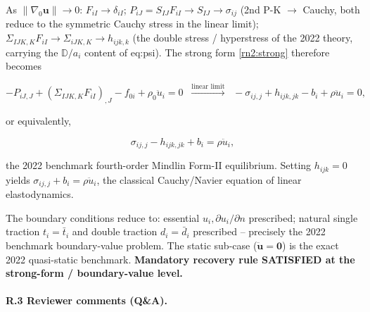 \documentclass[11pt]{article}
\begin{document}
As $\|\nabla_0\mathbf{u}\|\to0$: $F_{iI}\to\delta_{iI}$; $P_{iJ}=S_{IJ}F_{iI}\to S_{IJ}\to\sigma_{ij}$ (2nd P-K $\to$ Cauchy, both reduce to the symmetric Cauchy stress in the linear limit); $\Sigma_{IJK,K}F_{iI}\to\Sigma_{iJK,K}\to h_{ijk,k}$ (the double stress / hyperstress of the 2022 theory, carrying the $\mathbb{D}/a_i$ content of eq:psi). The strong form \eqref{rn2:strong} therefore becomes

\begin{equation}
-P_{iJ,J}+(\Sigma_{IJK,K}F_{iI})_{,J}-f_{0i}+\rho_0\ddot{u}_i=0
\;\;\xrightarrow{\text{linear limit}}\;\;
-\sigma_{ij,j}+h_{ijk,jk}-b_i+\rho\ddot{u}_i=0,
\end{equation}

or equivalently,

\begin{equation}
\sigma_{ij,j}-h_{ijk,jk}+b_i=\rho\ddot{u}_i,
\label{rn2:strong_small}
\end{equation}

the 2022 benchmark fourth-order Mindlin Form-II equilibrium. Setting $h_{ijk}=0$ yields $\sigma_{ij,j}+b_i=\rho\ddot{u}_i$, the classical Cauchy/Navier equation of linear elastodynamics. \checkmark

The boundary conditions reduce to: essential $u_i,\partial u_i/\partial n$ prescribed; natural single traction $t_i=\bar{t}_i$ and double traction $d_i=\bar{d}_i$ prescribed -- precisely the 2022 benchmark boundary-value problem. The static sub-case ($\ddot{\mathbf{u}}=\mathbf{0}$) is the exact 2022 quasi-static benchmark. \textbf{Mandatory recovery rule SATISFIED at the strong-form / boundary-value level.} \checkmark

\paragraph{R.3 Reviewer comments (Q\&A).}
\end{document}
